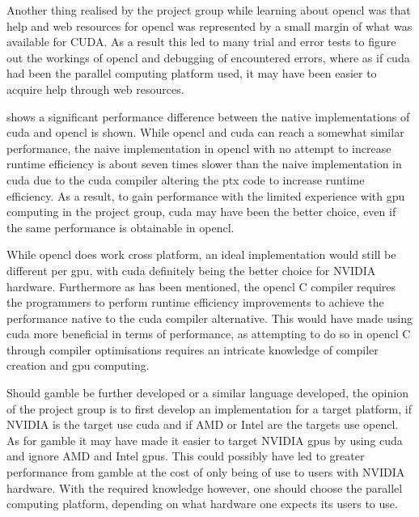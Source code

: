 Another thing realised by the project group while learning about \gls{opencl} was that help and web resources for \gls{opencl} was represented by a small margin of what was available for CUDA.
As a result this led to many trial and error tests to figure out the workings of \gls{opencl} and debugging of encountered errors, where as if \gls{cuda} had been the parallel computing platform used, it may have been easier to acquire help through web resources.

 shows a significant performance difference between the native implementations of \gls{cuda} and \gls{opencl} is shown.
While \gls{opencl} and \gls{cuda} can reach a somewhat similar performance, the naive implementation in \gls{opencl} with no attempt to increase runtime efficiency is about seven times slower than the naive implementation in \gls{cuda} due to the \gls{cuda} compiler altering the \acrshort{ptx} code to increase runtime efficiency.
As a result, to gain performance with the limited experience with \acrshort{gpu} computing in the project group, \gls{cuda} may have been the better choice, even if the same performance is obtainable in \gls{opencl}.

While \gls{opencl} does work cross platform, an ideal implementation would still be different per \acrshort{gpu}, with \gls{cuda} definitely being the better choice for NVIDIA hardware.
Furthermore as has been mentioned, the \gls{opencl} C compiler requires the programmers to perform runtime efficiency improvements to achieve the performance native to the \gls{cuda} compiler alternative.
This would have made using \gls{cuda} more beneficial in terms of performance, as attempting to do so in \gls{opencl} C through compiler optimisations requires an intricate knowledge of compiler creation and \acrshort{gpu} computing.

Should \gls{gamble} be further developed or a similar language developed, the opinion of the project group is to first develop an implementation for a target platform, if NVIDIA is the target use \gls{cuda} and if AMD or Intel are the targets use \gls{opencl}.
As for \gls{gamble} it may have made it easier to target NVIDIA \acrshort{gpu}s by using \gls{cuda} and ignore AMD and Intel \acrshort{gpu}s. 
This could possibly have led to greater performance from \gls{gamble} at the cost of only being of use to users with NVIDIA hardware.
With the required knowledge however, one should choose the parallel computing platform, depending on what hardware one expects its users to use.
